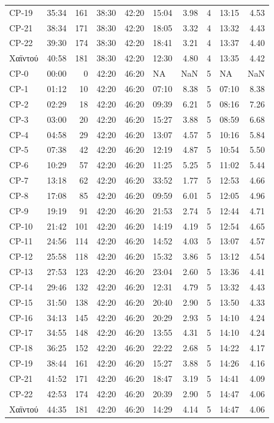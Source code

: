 \documentclass[]{elsarticle} %
\begin{document}
\begin{longtable}[t]{llrlllrllr}
CP-19 & 35:34 & 161 & 38:30 & 42:20 & 15:04 & 3.98 & 4 & 13:15 & 4.53\\
CP-21 & 38:34 & 171 & 38:30 & 42:20 & 18:05 & 3.32 & 4 & 13:32 & 4.43\\
CP-22 & 39:30 & 174 & 38:30 & 42:20 & 18:41 & 3.21 & 4 & 13:37 & 4.40\\
\addlinespace
Χαϊντού & 40:58 & 181 & 38:30 & 42:20 & 12:30 & 4.80 & 4 & 13:35 & 4.42\\
CP-0 & 00:00 & 0 & 42:20 & 46:20 & NA & NaN & 5 & NA & NaN\\
CP-1 & 01:12 & 10 & 42:20 & 46:20 & 07:10 & 8.38 & 5 & 07:10 & 8.38\\
CP-2 & 02:29 & 18 & 42:20 & 46:20 & 09:39 & 6.21 & 5 & 08:16 & 7.26\\
CP-3 & 03:00 & 20 & 42:20 & 46:20 & 15:27 & 3.88 & 5 & 08:59 & 6.68\\
\addlinespace
CP-4 & 04:58 & 29 & 42:20 & 46:20 & 13:07 & 4.57 & 5 & 10:16 & 5.84\\
CP-5 & 07:38 & 42 & 42:20 & 46:20 & 12:19 & 4.87 & 5 & 10:54 & 5.50\\
CP-6 & 10:29 & 57 & 42:20 & 46:20 & 11:25 & 5.25 & 5 & 11:02 & 5.44\\
CP-7 & 13:18 & 62 & 42:20 & 46:20 & 33:52 & 1.77 & 5 & 12:53 & 4.66\\
CP-8 & 17:08 & 85 & 42:20 & 46:20 & 09:59 & 6.01 & 5 & 12:05 & 4.96\\
\addlinespace
CP-9 & 19:19 & 91 & 42:20 & 46:20 & 21:53 & 2.74 & 5 & 12:44 & 4.71\\
CP-10 & 21:42 & 101 & 42:20 & 46:20 & 14:19 & 4.19 & 5 & 12:54 & 4.65\\
CP-11 & 24:56 & 114 & 42:20 & 46:20 & 14:52 & 4.03 & 5 & 13:07 & 4.57\\
CP-12 & 25:58 & 118 & 42:20 & 46:20 & 15:32 & 3.86 & 5 & 13:12 & 4.54\\
CP-13 & 27:53 & 123 & 42:20 & 46:20 & 23:04 & 2.60 & 5 & 13:36 & 4.41\\
\addlinespace
CP-14 & 29:46 & 132 & 42:20 & 46:20 & 12:31 & 4.79 & 5 & 13:32 & 4.43\\
CP-15 & 31:50 & 138 & 42:20 & 46:20 & 20:40 & 2.90 & 5 & 13:50 & 4.33\\
CP-16 & 34:13 & 145 & 42:20 & 46:20 & 20:29 & 2.93 & 5 & 14:10 & 4.24\\
CP-17 & 34:55 & 148 & 42:20 & 46:20 & 13:55 & 4.31 & 5 & 14:10 & 4.24\\
CP-18 & 36:25 & 152 & 42:20 & 46:20 & 22:22 & 2.68 & 5 & 14:22 & 4.17\\
\addlinespace
CP-19 & 38:44 & 161 & 42:20 & 46:20 & 15:27 & 3.88 & 5 & 14:26 & 4.16\\
CP-21 & 41:52 & 171 & 42:20 & 46:20 & 18:47 & 3.19 & 5 & 14:41 & 4.09\\
CP-22 & 42:53 & 174 & 42:20 & 46:20 & 20:39 & 2.90 & 5 & 14:47 & 4.06\\
Χαϊντού & 44:35 & 181 & 42:20 & 46:20 & 14:29 & 4.14 & 5 & 14:47 & 4.06\\
\bottomrule
\end{longtable}
\end{document}
